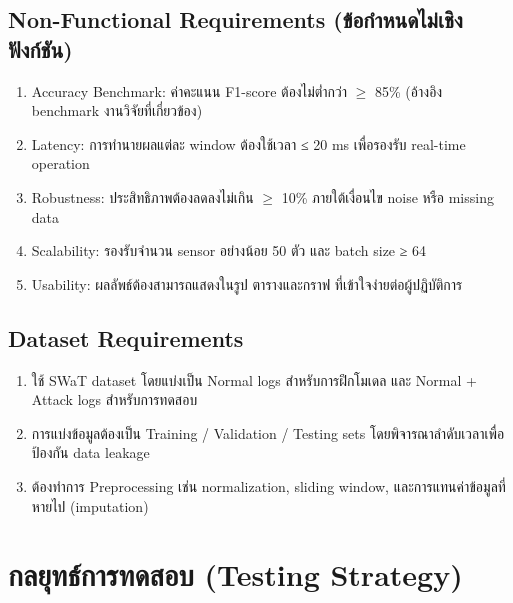 \subsection{Non-Functional Requirements (ข้อกำหนดไม่เชิงฟังก์ชัน)}
\begin{enumerate}
    \item Accuracy Benchmark: ค่าคะแนน F1-score ต้องไม่ต่ำกว่า $\ge$ 85\% (อ้างอิง benchmark งานวิจัยที่เกี่ยวข้อง)
    \item Latency: การทำนายผลแต่ละ window ต้องใช้เวลา ≤ 20 ms เพื่อรองรับ real-time operation
    \item Robustness: ประสิทธิภาพต้องลดลงไม่เกิน $\ge$ 10\% ภายใต้เงื่อนไข noise หรือ missing data
    \item Scalability: รองรับจำนวน sensor อย่างน้อย 50 ตัว และ batch size ≥ 64
    \item Usability: ผลลัพธ์ต้องสามารถแสดงในรูป ตารางและกราฟ ที่เข้าใจง่ายต่อผู้ปฏิบัติการ
\end{enumerate}

\subsection{Dataset Requirements}
\begin{enumerate}
    \item ใช้ SWaT dataset โดยแบ่งเป็น Normal logs สำหรับการฝึกโมเดล และ Normal + Attack logs สำหรับการทดสอบ
    \item การแบ่งข้อมูลต้องเป็น Training / Validation / Testing sets โดยพิจารณาลำดับเวลาเพื่อป้องกัน data leakage
    \item ต้องทำการ Preprocessing เช่น normalization, sliding window, และการแทนค่าข้อมูลที่หายไป (imputation)
\end{enumerate}

\section{กลยุทธ์การทดสอบ (Testing Strategy)}
